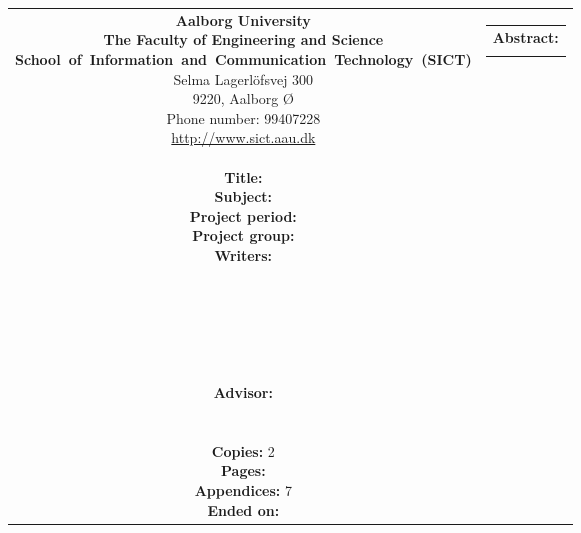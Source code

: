 \thispagestyle{empty}
{\samepage 
\begin{tabular}{cc}
	\parbox{7cm}{
	{\sf\noindent
	\textbf{Aalborg University}\\
	\textbf{The Faculty of Engineering and Science}\\
	\mbox{\textbf{School of Information and Communication Technology (SICT)}}\\
	Selma Lagerlöfsvej 300\\
	9220, Aalborg Ø\\
	Phone number: 99407228\\
	\url{http://www.sict.aau.dk}} \\\\
	{\bf Title:} \TITLE\\
	{\bf Subject:} \SUBJECT\\
	{\bf Project period:} \PERIOD\\
	{\bf Project group:} \GROUPNUMBER\\
	{\bf Writers:}\\[0.7cm]
      		\underline{\phantom{\TPNAMESPACE}}\\
      		\NAMEONE \\[0.7cm]
      		\underline{\phantom{\TPNAMESPACE}}\\
      		\NAMETWO \\[0.7cm]
      		\underline{\phantom{\TPNAMESPACE}}\\
      		\NAMETHREE \\[0.7cm]
	{\bf Advisor:} \\
	\SUPERVISOR \\\\
	{\bf Copies:} 2\\
	{\bf Pages:} \pageref{LastPage}\\
	{\bf Appendices:} 7\\
	{\bf Ended on:} \ENDDATE
	\vfill} &
	\parbox{7cm}{
	\vspace{.15cm}
	\hfill 
	\begin{tabular}{l}
		{\bf Abstract:}\bigskip \\
		\fbox{
		\parbox{6cm}{\bigskip
		{\vfill{\small 
		\bigskip}}
		}\hspace{0.2em}}
	\end{tabular}}
\end{tabular}\vfill
{}
}